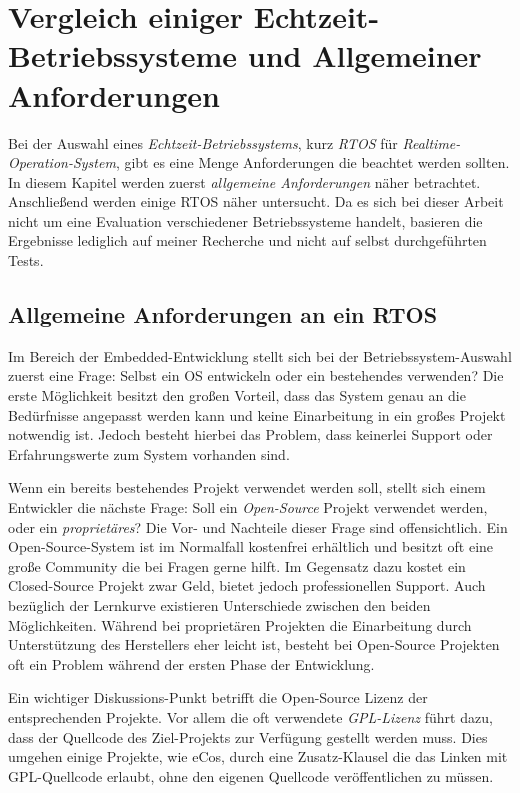 \documentclass[
  a4paper,					%
  twoside,
  DIV=calc,     				%
  bibliography=totoc,
  cleardoublepage=empty,
  ngerman,     					%
  final       					%
]{scrbook}
\begin{document}
\chapter{Vergleich einiger Echtzeit-Betriebssysteme und Allgemeiner Anforderungen}
\label{sec:VergleichRTOS}
Bei der Auswahl eines \emph{Echtzeit-Betriebssystems}, kurz \emph{RTOS} für \emph{Realtime-Operation-System}, gibt es eine Menge Anforderungen die beachtet werden sollten. In diesem Kapitel werden zuerst \emph{allgemeine Anforderungen} näher betrachtet. Anschließend werden einige RTOS näher untersucht. Da es sich bei dieser Arbeit nicht um eine Evaluation verschiedener Betriebssysteme handelt, basieren die Ergebnisse lediglich auf meiner Recherche und nicht auf selbst durchgeführten Tests.

\section{Allgemeine Anforderungen an ein RTOS}
\label{sec:AllgemeineAnforderungen}
Im Bereich der Embedded-Entwicklung stellt sich bei der Betriebssystem-Auswahl zuerst eine Frage: Selbst ein OS entwickeln oder ein bestehendes verwenden? Die erste Möglichkeit besitzt den großen Vorteil, dass das System genau an die Bedürfnisse angepasst werden kann und keine Einarbeitung in ein großes Projekt notwendig ist. Jedoch besteht hierbei das Problem, dass keinerlei Support oder Erfahrungswerte zum System vorhanden sind.

Wenn ein bereits bestehendes Projekt verwendet werden soll, stellt sich einem Entwickler die nächste Frage: Soll ein \emph{Open-Source} Projekt verwendet werden, oder ein \emph{proprietäres}? Die Vor- und Nachteile dieser Frage sind offensichtlich. Ein Open-Source-System ist im Normalfall kostenfrei erhältlich und besitzt oft eine große Community die bei Fragen gerne hilft. Im Gegensatz dazu kostet ein Closed-Source Projekt zwar Geld, bietet jedoch professionellen Support. Auch bezüglich der Lernkurve existieren Unterschiede zwischen den beiden Möglichkeiten. Während bei proprietären Projekten die Einarbeitung durch Unterstützung des Herstellers eher leicht ist, besteht bei Open-Source Projekten oft ein Problem während der ersten Phase der Entwicklung.

Ein wichtiger Diskussions-Punkt betrifft die Open-Source Lizenz der entsprechenden Projekte. Vor allem die oft verwendete \emph{GPL-Lizenz} führt dazu, dass der Quellcode des Ziel-Projekts zur Verfügung gestellt werden muss. Dies umgehen einige Projekte, wie eCos, durch eine Zusatz-Klausel die das Linken mit GPL-Quellcode erlaubt, ohne den eigenen Quellcode veröffentlichen zu müssen.
\end{document}
